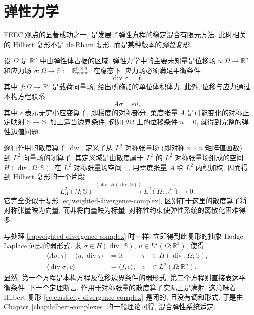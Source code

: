 \section{弹性力学}\label{sec:elasticity}

FEEC 观点的显著成功之一, 是发展了弹性方程的稳定混合有限元方法. 此时相关的 Hilbert 复形不是 de Rham 复形, 而是某种版本的\emph{弹性复形}.

设 $\Omega$ 是 $\mathbb R^n$ 中由弹性体占据的区域. 弹性力学中的主要未知量是位移场 $u:\Omega\to\mathbb R^n$ 和应力场 $\sigma:\Omega\to\mathbb S:=\mathbb R_{\mathrm{symm}}^{n\times n}$. 在稳态下, 应力场必须满足平衡条件
\[
\operatorname{div}\sigma=f,
\]
其中 $f:\Omega\to\mathbb R^n$ 是载荷向量场, 给出所施加的单位体积体力. 此外, 位移与应力通过本构方程联系
\[
A\sigma=\epsilon u,
\]
其中 $\epsilon$ 表示无穷小应变算子, 即梯度的对称部分, 柔度张量 $A$ 是可能变化的对称正定映射 $\mathbb S\to\mathbb S$. 加上适当边界条件, 例如 $\partial\Omega$ 上的位移条件 $u=0$, 就得到完整的弹性边值问题.

逐行作用的散度算子 $\operatorname{div}$, 定义了从 $L^2$ 对称张量场 (即对称 $n\times n$ 矩阵值函数) 到 $L^2$ 向量场的闭算子. 其定义域是由散度属于 $L^2$ 的 $L^2$ 对称张量场组成的空间 $H(\operatorname{div},\Omega;\mathbb S)$. 在 $L^2$ 对称张量场空间上, 用柔度张量 $A$ 给 $L^2$ 内积加权, 因而得到 Hilbert 复形的一个片段
\begin{equation}\label{eq:elasticity-divergence-complex}
L_A^2(\Omega;\mathbb S)\xrightarrow{(\operatorname{div},H(\operatorname{div};\mathbb S))}L^2(\Omega;\mathbb R^n)\to0.
\end{equation}
它完全类似于复形 \eqref{eq:weighted-divergence-complex}, 区别在于这里的散度算子将对称张量映为向量, 而非将向量映为标量. 对称性约束使弹性系统的离散化困难得多.

与处理 \eqref{eq:weighted-divergence-complex} 时一样, 立即得到此复形的抽象 Hodge Laplace 问题的弱形式. 求 $\sigma\in H(\operatorname{div};\mathbb S)$, $u\in L^2(\Omega;\mathbb R^n)$, 使得
\[
\begin{aligned}\langle A\sigma,\tau\rangle-\langle u,\operatorname{div}\tau\rangle&=0,&\tau&\in H(\operatorname{div},\Omega;\mathbb S),\\\langle\operatorname{div}\sigma,v\rangle&=\langle f,v\rangle,&v&\in L^2(\Omega;\mathbb R^n).\end{aligned}
\]
显然, 第一个方程是本构方程及位移边界条件的弱形式, 第二个方程则直接表达平衡条件. 下一个定理断言, 作用于对称张量的散度算子实际上是满射. 这意味着 Hilbert 复形 \eqref{eq:elasticity-divergence-complex} 是闭的, 且没有调和形式. 于是由 Chapter~\ref{chap:hilbert-complexes} 的一般理论可得, 混合弹性系统适定.


